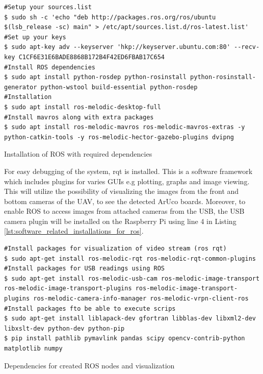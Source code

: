 \documentclass[../Head/report.tex]{subfiles}
\begin{document}
\begin{listing}[H] 
\begin{tcolorbox}[
    enhanced,
    attach boxed title to top left={xshift=6mm,yshift=-3mm},
    colback=lightgreen!20,
    colframe=lightgreen,
    fonttitle=\bfseries\color{black},
]
\begin{verbatim}
#Setup your sources.list
$ sudo sh -c 'echo "deb http://packages.ros.org/ros/ubuntu $(lsb_release -sc) main" > /etc/apt/sources.list.d/ros-latest.list'
#Set up your keys
$ sudo apt-key adv --keyserver 'hkp://keyserver.ubuntu.com:80' --recv-key C1CF6E31E6BADE8868B172B4F42ED6FBAB17C654
#Install ROS dependencies 
$ sudo apt install python-rosdep python-rosinstall python-rosinstall-generator python-wstool build-essential python-rosdep
#Installation
$ sudo apt install ros-melodic-desktop-full
#Install mavros along with extra packages
$ sudo apt install ros-melodic-mavros ros-melodic-mavros-extras -y python-catkin-tools -y ros-melodic-hector-gazebo-plugins dvipng
\end{verbatim}
\end{tcolorbox}
\caption{Installation of ROS with required dependencies}
\label{lst:ros_installation}    
\end{listing}   

For easy debugging of the system, rqt is installed. This is a software framework which includes plugins for varies GUIs e.g plotting, graphs and image viewing. This will utilize the possibility of visualizing the images from the front and bottom cameras of the UAV, to see the detected ArUco boards. Moreover, to enable ROS to access images from attached cameras from the USB, the USB camera plugin will be installed on the Raspberry Pi using line 4 in Listing \ref{lst:software_related_installations_for_ros}.  

\begin{listing}[H] 
\begin{tcolorbox}[
    enhanced,
    attach boxed title to top left={xshift=6mm,yshift=-3mm},
    colback=lightgreen!20,
    colframe=lightgreen,
    fonttitle=\bfseries\color{black},
]
\begin{verbatim}
#Install packages for visualization of video stream (ros rqt)
$ sudo apt-get install ros-melodic-rqt ros-melodic-rqt-common-plugins
#Install packages for USB readings using ROS
$ sudo apt-get install ros-melodic-usb-cam ros-melodic-image-transport ros-melodic-image-transport-plugins ros-melodic-image-transport-plugins ros-melodic-camera-info-manager ros-melodic-vrpn-client-ros
#Install packages fto be able to execute scrips
$ sudo apt-get install liblapack-dev gfortran libblas-dev libxml2-dev libxslt-dev python-dev python-pip
$ pip install pathlib pymavlink pandas scipy opencv-contrib-python matplotlib numpy
\end{verbatim}
\end{tcolorbox}
\caption{Dependencies for created ROS nodes and visualization}
\label{lst:software_related_installations_for_ros}    
\end{listing}   
\end{document}
